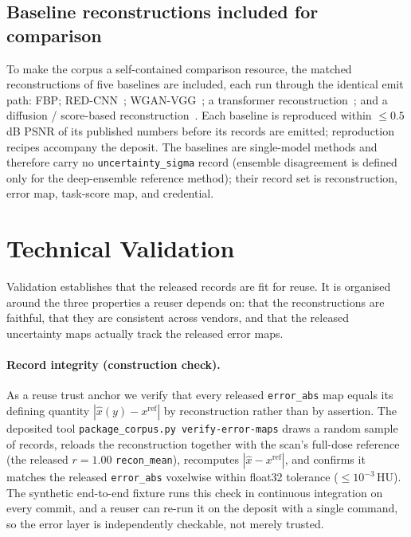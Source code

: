 \documentclass{article}
\begin{document}
\subsection{Baseline reconstructions included for comparison}
\label{sec:baselines}
To make the corpus a self-contained comparison resource, the matched
reconstructions of five baselines are included, each run through the
identical emit path: FBP; RED-CNN~\citep{chen2017redcnn};
WGAN-VGG~\citep{yang2018ctgan}; a transformer
reconstruction~\citep{wang2023ctformer}; and a diffusion / score-based
reconstruction~\citep{song2022scorebased}. Each baseline is reproduced
within $\leq 0.5$\,dB PSNR of its published numbers before its records are
emitted; reproduction recipes accompany the deposit. The baselines are
single-model methods and therefore carry no \texttt{uncertainty\_sigma}
record (ensemble disagreement is defined only for the deep-ensemble
reference method); their record set is reconstruction, error map,
task-score map, and credential.

\section{Technical Validation}
\label{sec:validation}

Validation establishes that the released records are fit for reuse. It is
organised around the three properties a reuser depends on: that the
reconstructions are faithful, that they are consistent across vendors, and
that the released uncertainty maps actually track the released error
maps.

\paragraph{Record integrity (construction check).} As a reuse trust
anchor we verify that every released \texttt{error\_abs} map equals its
defining quantity $|\hat{x}(y)-x^{\textrm{ref}}|$ by reconstruction
rather than by assertion. The deposited tool
\texttt{package\_corpus.py\ verify-error-maps} draws a random sample of
records, reloads the reconstruction together with the scan's full-dose
reference (the released $r=1.00$ \texttt{recon\_mean}), recomputes
$|\hat{x}-x^{\textrm{ref}}|$, and confirms it matches the released
\texttt{error\_abs} voxelwise within float32 tolerance
($\leq 10^{-3}$\,HU). The synthetic end-to-end fixture runs this check in
continuous integration on every commit, and a reuser can re-run it on the
deposit with a single command, so the error layer is independently
checkable, not merely trusted.
\end{document}
